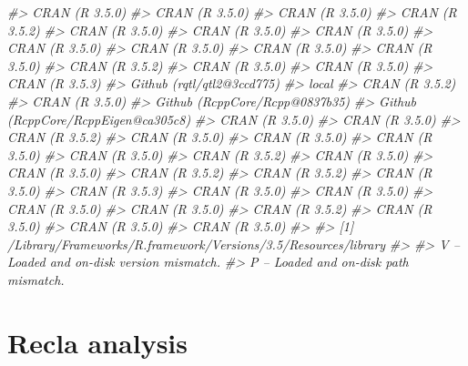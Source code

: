 \documentclass[oneside]{book}\usepackage[]{graphicx}\usepackage[]{color}
\newenvironment{Shaded}{\begin{snugshade}}{\end{snugshade}}
\newcommand{\CommentTok}[1]{\textcolor[rgb]{0.56,0.35,0.01}{\textit{#1}}}
\begin{document}
\begin{Shaded}
\begin{Highlighting}[]
\CommentTok{#>  CRAN (R 3.5.0)                     }
\CommentTok{#>  CRAN (R 3.5.0)                     }
\CommentTok{#>  CRAN (R 3.5.0)                     }
\CommentTok{#>  CRAN (R 3.5.2)                     }
\CommentTok{#>  CRAN (R 3.5.0)                     }
\CommentTok{#>  CRAN (R 3.5.0)                     }
\CommentTok{#>  CRAN (R 3.5.0)                     }
\CommentTok{#>  CRAN (R 3.5.0)                     }
\CommentTok{#>  CRAN (R 3.5.0)                     }
\CommentTok{#>  CRAN (R 3.5.0)                     }
\CommentTok{#>  CRAN (R 3.5.0)                     }
\CommentTok{#>  CRAN (R 3.5.2)                     }
\CommentTok{#>  CRAN (R 3.5.0)                     }
\CommentTok{#>  CRAN (R 3.5.0)                     }
\CommentTok{#>  CRAN (R 3.5.3)                     }
\CommentTok{#>  Github (rqtl/qtl2@3ccd775)         }
\CommentTok{#>  local                              }
\CommentTok{#>  CRAN (R 3.5.2)                     }
\CommentTok{#>  CRAN (R 3.5.0)                     }
\CommentTok{#>  Github (RcppCore/Rcpp@0837b35)     }
\CommentTok{#>  Github (RcppCore/RcppEigen@ca305c8)}
\CommentTok{#>  CRAN (R 3.5.0)                     }
\CommentTok{#>  CRAN (R 3.5.0)                     }
\CommentTok{#>  CRAN (R 3.5.2)                     }
\CommentTok{#>  CRAN (R 3.5.0)                     }
\CommentTok{#>  CRAN (R 3.5.0)                     }
\CommentTok{#>  CRAN (R 3.5.0)                     }
\CommentTok{#>  CRAN (R 3.5.0)                     }
\CommentTok{#>  CRAN (R 3.5.2)                     }
\CommentTok{#>  CRAN (R 3.5.0)                     }
\CommentTok{#>  CRAN (R 3.5.0)                     }
\CommentTok{#>  CRAN (R 3.5.2)                     }
\CommentTok{#>  CRAN (R 3.5.2)                     }
\CommentTok{#>  CRAN (R 3.5.0)                     }
\CommentTok{#>  CRAN (R 3.5.3)                     }
\CommentTok{#>  CRAN (R 3.5.0)                     }
\CommentTok{#>  CRAN (R 3.5.0)                     }
\CommentTok{#>  CRAN (R 3.5.0)                     }
\CommentTok{#>  CRAN (R 3.5.0)                     }
\CommentTok{#>  CRAN (R 3.5.2)                     }
\CommentTok{#>  CRAN (R 3.5.0)                     }
\CommentTok{#>  CRAN (R 3.5.0)                     }
\CommentTok{#>  CRAN (R 3.5.0)                     }
\CommentTok{#> }
\CommentTok{#> [1] /Library/Frameworks/R.framework/Versions/3.5/Resources/library}
\CommentTok{#> }
\CommentTok{#>  V -- Loaded and on-disk version mismatch.}
\CommentTok{#>  P -- Loaded and on-disk path mismatch.}
\end{Highlighting}
\end{Shaded}




\section{Recla analysis}






\printbibliography
\end{document}
